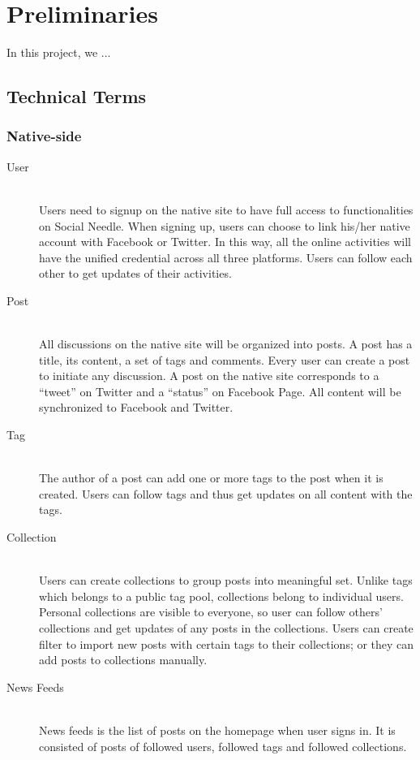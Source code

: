 
%
%

\chapter{Preliminaries}
In this project, we ...
\section{Technical Terms}
\subsection{Native-side}
\begin{description}
	\item[User] \hfill \\
	Users need to signup on the native site to have full access to functionalities on Social Needle. When signing up, users can choose to link his/her native account with Facebook or Twitter. In this way, all the online activities will have the unified credential across all three platforms. 
	Users can follow each other to get updates of their activities. 
	\item[Post] \hfill \\
	All discussions on the native site will be organized into posts. A post has a title, its content, a set of tags and comments. Every user can create a post to initiate any discussion. A post on the native site corresponds to a ``tweet'' on Twitter and a ``status'' on Facebook Page. All content will be synchronized to Facebook and Twitter.
	\item[Tag] \hfill \\
	The author of a post can add one or more tags to the post when it is created. Users can follow tags and thus get updates on all content with the tags. 
	\item[Collection] \hfill \\
	Users can create collections to group posts into meaningful set. Unlike tags which belongs to a public tag pool, collections belong to individual users. Personal collections are visible to everyone, so user can follow others' collections and get updates of any posts in the collections. Users can create filter to import new posts with certain tags to their collections; or they can add posts to collections manually. 
	\item[News Feeds] \hfill \\
	News feeds is the list of posts on the homepage when user signs in. It is consisted of posts of followed users, followed tags and followed collections. 
\end{description}
